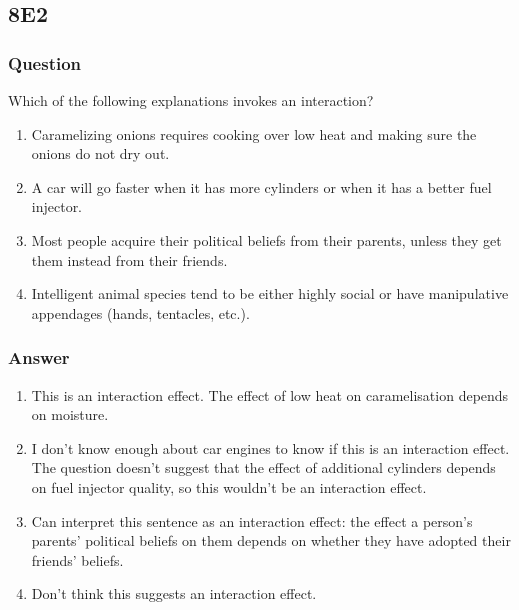 \documentclass[
]{book}
\begin{document}
\hypertarget{e2-5}{%
\subsection*{8E2}\label{e2-5}}

\hypertarget{question-76}{%
\subsubsection*{Question}\label{question-76}}

Which of the following explanations invokes an interaction?

\begin{enumerate}
\def\labelenumi{\arabic{enumi}.}
\item
  Caramelizing onions requires cooking over low heat and making sure the onions do not dry out.
\item
  A car will go faster when it has more cylinders or when it has a better fuel injector.
\item
  Most people acquire their political beliefs from their parents, unless they get them instead from their friends.
\item
  Intelligent animal species tend to be either highly social or have manipulative appendages (hands, tentacles, etc.).
\end{enumerate}

\hypertarget{answer-76}{%
\subsubsection*{Answer}\label{answer-76}}

\begin{enumerate}
\def\labelenumi{\arabic{enumi}.}
\item
  This is an interaction effect. The effect of low heat on caramelisation depends on moisture.
\item
  I don't know enough about car engines to know if this is an interaction effect. The question doesn't suggest that the effect of additional cylinders depends on fuel injector quality, so this wouldn't be an interaction effect.
\item
  Can interpret this sentence as an interaction effect: the effect a person's parents' political beliefs on them depends on whether they have adopted their friends' beliefs.
\item
  Don't think this suggests an interaction effect.
\end{enumerate}
\end{document}
